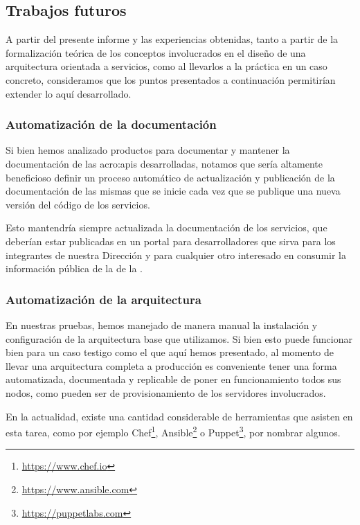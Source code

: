 \subsection{Trabajos futuros}
\label{trabajos-a-futuro}

A partir del presente informe y las experiencias obtenidas, tanto a partir de la formalización teórica de los conceptos involucrados en el diseño de una arquitectura orientada a servicios, como al llevarlos a la práctica en un caso concreto, consideramos que los puntos presentados a continuación permitirían extender lo aquí desarrollado.

\subsubsection{Automatización de la documentación}

Si bien hemos analizado productos para documentar y mantener la documentación de las \glspl{acro:api} desarrolladas, notamos que sería altamente beneficioso definir un proceso automático de actualización y publicación de la documentación de las mismas que se inicie cada vez que se publique una nueva versión del código de los servicios.

Esto mantendría siempre actualizada la documentación de los servicios, que deberían estar publicadas en un portal para desarrolladores que sirva para los integrantes de nuestra Dirección y para cualquier otro interesado en consumir la información pública de la {\cloud} de la {\unlp}.

\subsubsection{Automatización de la arquitectura}

En nuestras pruebas, hemos manejado de manera manual la instalación y configuración de la arquitectura base que utilizamos. Si bien esto puede funcionar bien para un caso testigo como el que aquí hemos presentado, al momento de llevar una arquitectura completa a producción es conveniente tener una forma automatizada, documentada y replicable de poner en funcionamiento todos sus nodos, como pueden ser  de provisionamiento de los servidores involucrados.

En la actualidad, existe una cantidad considerable de herramientas que asisten en esta tarea, como por ejemplo Chef\footnote{\url{https://www.chef.io}}, Ansible\footnote{\url{https://www.ansible.com}} o Puppet\footnote{\url{https://puppetlabs.com}}, por nombrar algunos.

